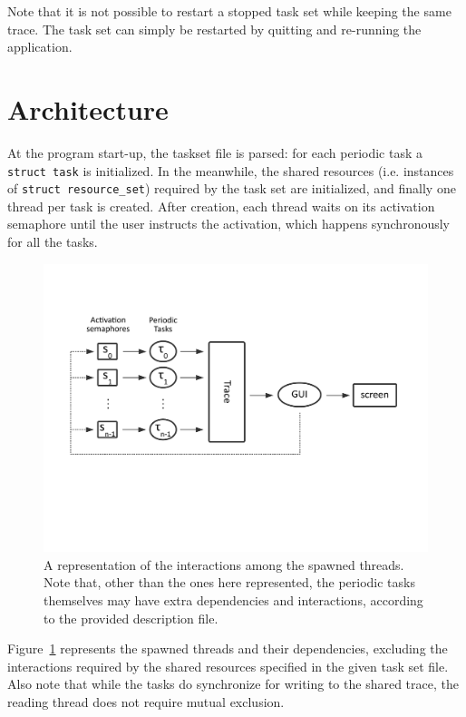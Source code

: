 \documentclass[paper=a4, fontsize=11pt]{scrartcl}
\newcommand{\mono}[1]{\texttt{#1}}
\numberwithin{equation}{section}        %
\numberwithin{figure}{section}          %
\numberwithin{table}{section}               %
\numberwithin{fragment}{section}
\begin{document}
Note that it is not possible to restart a stopped task set while keeping the same trace. The task set can simply be restarted by quitting and re-running the application.


\section{Architecture}\label{sec:arch}

At the program start-up, the taskset file is parsed: for each periodic task a \mono{struct task} is initialized. In the meanwhile, the shared resources (i.e. instances of \mono{struct resource\_set}) required by the task set are initialized, and finally one thread per task is created. After creation, each thread waits on its activation semaphore until the user instructs the activation, which happens synchronously for all the tasks.

\begin{figure}
  \centering
  \includegraphics[width=.9\textwidth,trim=0cm 7cm 0cm 3.5cm,clip]{img/tasks_resources_diagram.pdf}
  \caption{\label{fig:architecture} A representation of the interactions among the spawned threads. Note that, other than the ones here represented, the periodic tasks themselves may have extra dependencies and interactions, according to the provided description file.}
\end{figure}

Figure~\ref{fig:architecture} represents the spawned threads and their dependencies, excluding the interactions required by the shared resources specified in the given task set file. Also note that while the tasks do synchronize for writing to the shared trace, the reading thread does not require mutual exclusion.
\end{document}
